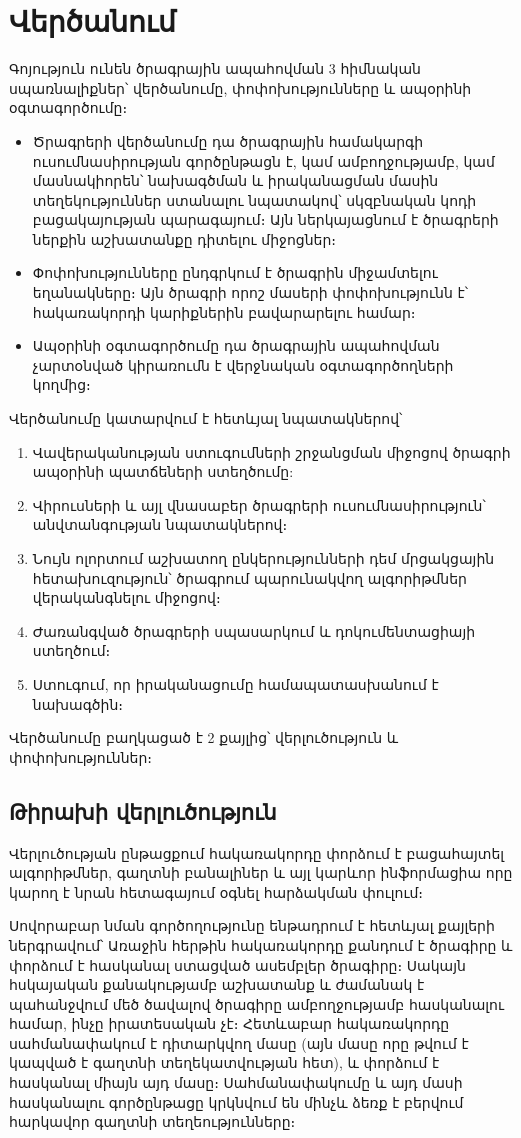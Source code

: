 \documentclass[12pt]{article}
\begin{document}
\begin{sloppypar}
\section{Վերծանում}
Գոյություն ունեն ծրագրային ապահովման 3 հիմնական սպառնալիքներ՝ վերծանումը,
փոփոխությունները և ապօրինի օգտագործումը։

\begin{itemize}
\item Ծրագրերի վերծանումը դա ծրագրային համակարգի ուսումնասիրության
	գործընթացն է, կամ ամբողջությամբ, կամ մասնակիորեն՝ նախագծման և
	իրականացման մասին տեղեկություններ ստանալու նպատակով՝ սկզբնական կոդի
	բացակայության պարագայում։ Այն ներկայացնում է ծրագրերի ներքին աշխատանքը
	դիտելու միջոցներ։
\item Փոփոխությունները ընդգրկում է ծրագրին միջամտելու եղանակները։
	Այն ծրագրի որոշ մասերի փոփոխությունն է՝ հակառակորդի կարիքներին բավարարելու
	համար։
\item Ապօրինի օգտագործումը դա ծրագրային ապահովման չարտօնված կիրառումն է
	վերջնական օգտագործողների կողմից։
\end{itemize}

Վերծանումը կատարվում է հետևյալ նպատակներով՝
\begin{enumerate}
\item Վավերականության ստուգումների շրջանցման միջոցով ծրագրի ապօրինի
	պատճեների ստեղծումը:
\item Վիրուսների և այլ վնասաբեր ծրագրերի ուսումնասիրություն՝ անվտանգության
	նպատակներով։
\item Նույն ոլորտում աշխատող ընկերությունների դեմ մրցակցային հետախուզություն՝
	ծրագրում պարունակվող ալգորիթմներ վերականգնելու միջոցով։
\item Ժառանգված ծրագրերի սպասարկում և դոկումենտացիայի ստեղծում։
\item Ստուգում, որ իրականացումը համապատասխանում է նախագծին։
\end{enumerate}

Վերծանումը բաղկացած է 2 քայլից՝ վերլուծություն և փոփոխություններ։

\subsection{Թիրախի վերլուծություն}
Վերլուծության ընթացքում հակառակորդը փորձում է բացահայտել ալգորիթմներ, գաղտնի
բանալիներ և այլ կարևոր ինֆորմացիա որը կարող է նրան հետագայում օգնել
հարձակման փուլում։

Սովորաբար նման գործողությունը ենթադրում է հետևյալ քայլերի ներգրավում՝
Առաջին հերթին հակառակորդը քանդում է ծրագիրը և փորձում է հասկանալ ստացված
ասեմբլեր ծրագիրը։ Սակայն հսկայական քանակությամբ աշխատանք և ժամանակ է
պահանջվում մեծ ծավալով ծրագիրը ամբողջությամբ հասկանալու համար, ինչը
իրատեսական չէ։ Հետևաբար հակառակորդը սահմանափակում է դիտարկվող մասը
(այն մասը որը թվում է կապված է գաղտնի տեղեկատվության հետ), և փորձում է
հասկանալ միայն այդ մասը։ Սահմանափակումը և այդ մասի հասկանալու գործընթացը
կրկնվում են մինչև ձեռք է բերվում հարկավոր գաղտնի տեղեությունները։


\end{sloppypar}
\end{document}
